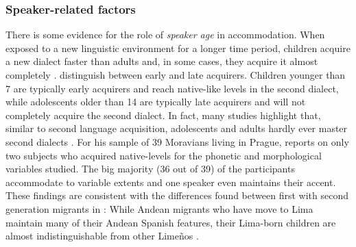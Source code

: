 \documentclass[output=paper,
modfonts
]{langscibook}
\begin{document}
\subsubsection{Speaker-related factors}
% 
% 
% 
%
There is some evidence for the role of \textit{speaker age} in accommodation. When exposed to a new linguistic environment for a longer time period, children acquire a new dialect faster than adults and, in some cases, they acquire it almost completely \citep{chambers_dialect_1992,siegel_second_2010,tagliamonte_howd_2007}.  \citet{chambers_dialect_1992} distinguish between early and late acquirers. Children younger than 7 are typically early acquirers and reach native-like levels in the second dialect, while adolescents older than 14 are typically late acquirers and will not completely acquire the second dialect. 
% 
% 
% 
%
In fact, many studies highlight that, similar to second language acquisition, adolescents and adults hardly ever master second dialects \citep{siegel_second_2010}. For his sample of 39 Moravians living in Prague, \cite{wilson_types_2011} reports on only two subjects who acquired native-levels for the phonetic and morphological variables studied. The big majority (36 out of 39) of the participants accommodate to variable extents and one speaker even maintains their accent. These findings are consistent with the differences found between first with second generation migrants in \cite{klee_andean_2006}: While Andean migrants who have move to Lima maintain many of their Andean Spanish features, their Lima-born children are almost indistinguishable from other Limeños \citep[for the linguistic effect of having non-native parents, see][]{payne_factors_1980}.
% 
\end{document}
